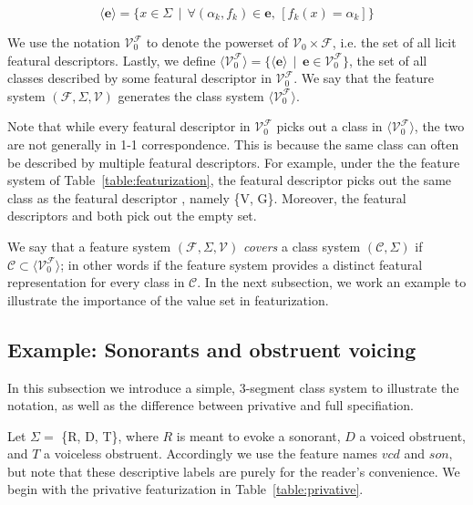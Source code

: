 \documentclass[11pt, oneside]{article}   	%
\begin{document}
$$ \big \langle \mathbf{e} \big \rangle = \{x \in \Sigma \, \mid \, \forall (\alpha_k, f_k) \in \mathbf{e} \text{,  } [ f_k(x) = \alpha_k ] \} $$

\vspace{\baselineskip} \noindent We use the notation $\mathcal V_0^\mathcal F$ to denote the powerset of $\mathcal V_0 \times \mathcal F$, i.e. the set of all licit featural descriptors. Lastly, we define $\langle \mathcal V_0^\mathcal F \rangle = \{ \langle \mathbf{e} \rangle \, \mid \, \mathbf{e} \in \mathcal V_0^\mathcal F \}$, the set of all classes described by some featural descriptor in $\mathcal V_0^\mathcal F$. We say that the feature system $(\mathcal F, \Sigma, \mathcal V)$ generates the class system $\langle \mathcal V_0^\mathcal F \rangle$.

Note that while every featural descriptor in $\mathcal V_0^\mathcal F$ picks out a class in $\langle \mathcal V_0^\mathcal F \rangle$, the two are not generally in 1-1 correspondence. This is because the same class can often be described by multiple featural descriptors. For example, under the the feature system of Table~\ref{table:featurization}, the featural descriptor  picks out the same class as the featural descriptor , namely \{V, G\}. Moreover, the featural descriptors  and  both pick out the empty set.

\vspace{\baselineskip} We say that a feature system $(\mathcal F, \Sigma, \mathcal V)$ \textit{covers} a class system $(\mathcal C, \Sigma)$ if $\mathcal C \subset \langle \mathcal V_0^\mathcal F \rangle$; in other words if the feature system provides a distinct featural representation for every class in $\mathcal C$. In the next subsection, we work an example to illustrate the importance of the value set in featurization.

\subsection{Example: Sonorants and obstruent voicing}

In this subsection we introduce a simple, 3-segment class system to illustrate the notation, as well as the difference between privative and full specifiation.

Let $\Sigma =$ \{R, D, T\}, where $R$ is meant to evoke a sonorant, $D$ a voiced obstruent, and $T$ a voiceless obstruent. Accordingly we use the feature names $vcd$ and $son$, but note that these descriptive labels are purely for the reader's convenience. We begin with the privative featurization in Table~\ref{table:privative}.
\end{document}
